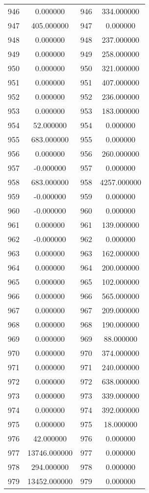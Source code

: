 \documentclass[12pt]{article}
\begin{document}
\begin{longtable}{@{}cccc@{}}
946 & 0.000000 & 946 & 334.000000 \\
947 & 405.000000 & 947 & 0.000000 \\
948 & 0.000000 & 948 & 237.000000 \\
949 & 0.000000 & 949 & 258.000000 \\
950 & 0.000000 & 950 & 321.000000 \\
951 & 0.000000 & 951 & 407.000000 \\
952 & 0.000000 & 952 & 236.000000 \\
953 & 0.000000 & 953 & 183.000000 \\
954 & 52.000000 & 954 & 0.000000 \\
955 & 683.000000 & 955 & 0.000000 \\
956 & 0.000000 & 956 & 260.000000 \\
957 & -0.000000 & 957 & 0.000000 \\
958 & 683.000000 & 958 & 4257.000000 \\
959 & -0.000000 & 959 & 0.000000 \\
960 & -0.000000 & 960 & 0.000000 \\
961 & 0.000000 & 961 & 139.000000 \\
962 & -0.000000 & 962 & 0.000000 \\
963 & 0.000000 & 963 & 162.000000 \\
964 & 0.000000 & 964 & 200.000000 \\
965 & 0.000000 & 965 & 102.000000 \\
966 & 0.000000 & 966 & 565.000000 \\
967 & 0.000000 & 967 & 209.000000 \\
968 & 0.000000 & 968 & 190.000000 \\
969 & 0.000000 & 969 & 88.000000 \\
970 & 0.000000 & 970 & 374.000000 \\
971 & 0.000000 & 971 & 240.000000 \\
972 & 0.000000 & 972 & 638.000000 \\
973 & 0.000000 & 973 & 339.000000 \\
974 & 0.000000 & 974 & 392.000000 \\
975 & 0.000000 & 975 & 18.000000 \\
976 & 42.000000 & 976 & 0.000000 \\
977 & 13746.000000 & 977 & 0.000000 \\
978 & 294.000000 & 978 & 0.000000 \\
979 & 13452.000000 & 979 & 0.000000 \\

\end{longtable}
\end{document}
